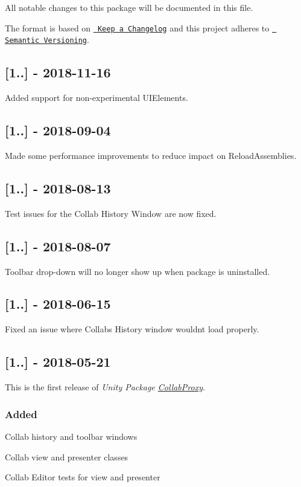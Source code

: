 All notable changes to this package will be documented in this file.

The format is based on \href{http://keepachangelog.com/en/1.0.0/}{\texttt{ Keep a Changelog}} and this project adheres to \href{http://semver.org/spec/v2.0.0.html}{\texttt{ Semantic Versioning}}.

\subsection*{\mbox{[}1..\mbox{]} -\/ 2018-\/11-\/16}

Added support for non-\/experimental U\+I\+Elements.

\subsection*{\mbox{[}1..\mbox{]} -\/ 2018-\/09-\/04}

Made some performance improvements to reduce impact on Reload\+Assemblies.

\subsection*{\mbox{[}1..\mbox{]} -\/ 2018-\/08-\/13}

Test issues for the Collab History Window are now fixed.

\subsection*{\mbox{[}1..\mbox{]} -\/ 2018-\/08-\/07}

Toolbar drop-\/down will no longer show up when package is uninstalled.

\subsection*{\mbox{[}1..\mbox{]} -\/ 2018-\/06-\/15}

Fixed an issue where Collab\textquotesingle{}s History window wouldn\textquotesingle{}t load properly.

\subsection*{\mbox{[}1..\mbox{]} -\/ 2018-\/05-\/21}

This is the first release of {\itshape Unity Package \mbox{\hyperlink{namespace_collab_proxy}{Collab\+Proxy}}}.

\subsubsection*{Added}


\begin{DoxyItemize}
\item Collab history and toolbar windows
\item Collab view and presenter classes
\item Collab Editor tests for view and presenter 
\end{DoxyItemize}